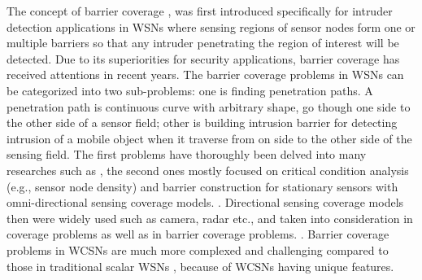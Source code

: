 The concept of barrier coverage \cite{kumar2005barrier}, was first introduced specifically for intruder detection applications in WSNs where sensing regions of sensor nodes form one or multiple barriers so that any intruder penetrating the region of interest will be detected. Due to its superiorities for security applications, barrier coverage has received attentions in recent years. The barrier coverage problems in WSNs can be categorized into two sub-problems: one is finding penetration paths. A penetration path is continuous curve with arbitrary shape, go though one side to the other side of a sensor field; other is building intrusion barrier for detecting intrusion of a mobile object when it traverse from on side to the other side of the sensing field. The first problems have thoroughly been delved into many researches such as \cite{megerian2002exposure,binh2016heuristic,liu2013percolation,binh2017genetic,binh2019efficient}, the second ones mostly focused on critical condition analysis (e.g., sensor node density) and barrier construction for stationary sensors with omni-directional sensing coverage models. \cite{liu2008strong,saipulla2008barrier,he2010distributed,skraba2007energy,chen2013energy}. Directional sensing coverage models then were widely used such as camera, radar etc., and taken into consideration in coverage problems as well as in barrier coverage problems.
 \cite{ai2006coverage,akyildiz2007survey,guvensan2011coverage,ma2005coverage,soro2005coverage}. Barrier coverage problems in WCSNs are much more complexed and challenging compared to those in traditional scalar WSNs \cite{chang2006collaborative,ma2012minimum,makhoul2009adaptive,wang2011barrier}, because of WCSNs having unique features.
 
